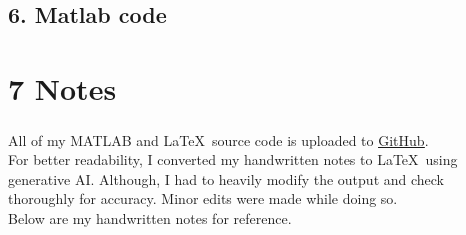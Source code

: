 \documentclass[12pt]{article}
\newcommand{\ghlink}[2]{\href{#1}{\color{blue}\uline{#2}}}
\begin{document}
\subsection*{6. Matlab code}
\label{subsec:6.6}



\section*{7 \quad Notes}
\label{sec:notes}

All of my MATLAB\textsuperscript{\textregistered} and \LaTeX \ source code is uploaded to \ghlink{https://github.com/ShantonuM/wes265_sp2026/tree/main/hw2}{GitHub}.\\[10pt]
For better readability, I converted my handwritten notes to  \LaTeX \ using generative AI. Although, I had to heavily modify the output and check thoroughly for accuracy. Minor edits were made while doing so.\\[10pt]
Below are my handwritten notes for reference.



\end{document}
